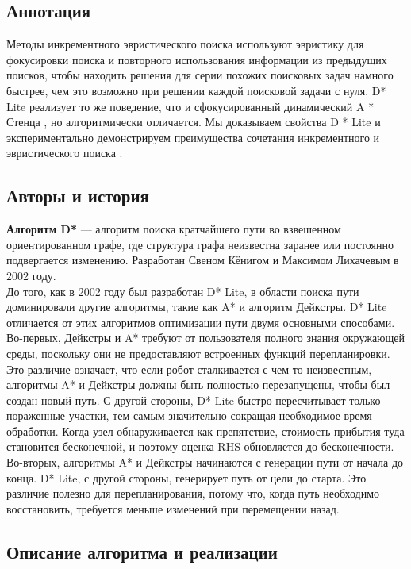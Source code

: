 \documentclass[12pt]{article}
\begin{document}
\begin{center}
   \section*{Аннотация} 
\end{center}
Методы инкрементного эвристического поиска используют эвристику для фокусировки поиска и повторного использования информации из предыдущих поисков, чтобы находить решения для серии похожих поисковых задач намного быстрее, чем это возможно при решении каждой поисковой задачи с нуля. D* Lite
реализует то же поведение, что и сфокусированный динамический A * Стенца
, но алгоритмически отличается. Мы доказываем свойства D * Lite и экспериментально демонстрируем преимущества  сочетания инкрементного и эвристического поиска . 
\begin{center}
   \section*{Авторы и история} 
\end{center}
\textbf{Алгоритм D*} — алгоритм поиска кратчайшего пути во взвешенном ориентированном графе, где структура графа неизвестна заранее или постоянно подвергается изменению. Разработан Свеном Кёнигом и Максимом Лихачевым в 2002 году.\\

До того, как в 2002 году был разработан D* Lite, в области поиска пути доминировали другие алгоритмы, такие как A* и алгоритм Дейкстры. D* Lite отличается от этих алгоритмов оптимизации пути двумя основными способами.\\ Во-первых, Дейкстры и A* требуют от пользователя полного знания окружающей среды, поскольку они не предоставляют встроенных функций перепланировки. Это различие означает, что если робот сталкивается с чем-то неизвестным, алгоритмы A* и Дейкстры должны быть полностью перезапущены, чтобы был создан новый путь. С другой стороны, D* Lite быстро пересчитывает только пораженные участки, тем самым значительно сокращая необходимое время обработки. Когда узел обнаруживается как препятствие, стоимость прибытия туда становится бесконечной, и поэтому оценка RHS обновляется до бесконечности.\\Во-вторых, алгоритмы A* и Дейкстры начинаются с генерации пути от начала до конца. D* Lite, с другой стороны, генерирует путь от цели до старта. Это различие полезно для перепланирования, потому что, когда путь необходимо восстановить, требуется меньше изменений при перемещении назад.
\newpage
\begin{center}
   \section*{Описание алгоритма и реализации} 
\end{center}
\end{document}
